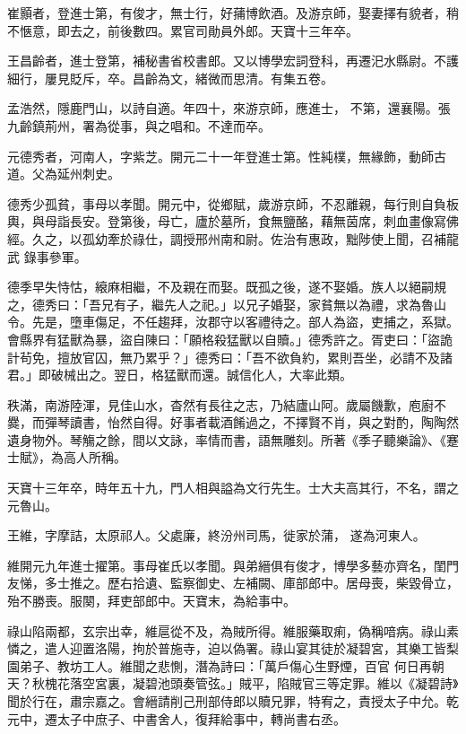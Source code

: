 \begin{pinyinscope}
 崔顥者，登進士第，有俊才，無士行，好蒱博飲酒。及游京師，娶妻擇有貌者，稍不愜意，即去之，前後數四。累官司勛員外郎。天寶十三年卒。



 王昌齡者，進士登第，補秘書省校書郎。又以博學宏詞登科，再遷汜水縣尉。不護細行，屢見貶斥，卒。昌齡為文，緒微而思清。有集五卷。



 孟浩然，隱鹿門山，以詩自適。年四十，來游京師，應進士，
 不第，還襄陽。張九齡鎮荊州，署為從事，與之唱和。不達而卒。



 元德秀者，河南人，字紫芝。開元二十一年登進士第。性純樸，無緣飾，動師古道。父為延州刺史。



 德秀少孤貧，事母以孝聞。開元中，從鄉賦，歲游京師，不忍離親，每行則自負板輿，與母詣長安。登第後，母亡，廬於墓所，食無鹽酪，藉無茵席，刺血畫像寫佛經。久之，以孤幼牽於祿仕，調授邢州南和尉。佐治有惠政，黜陟使上聞，召補龍武
 錄事參軍。



 德季早失恃怙，縗麻相繼，不及親在而娶。既孤之後，遂不娶婚。族人以絕嗣規之，德秀曰：「吾兄有子，繼先人之祀。」以兄子婚娶，家貧無以為禮，求為魯山令。先是，墮車傷足，不任趨拜，汝郡守以客禮待之。部人為盜，吏捕之，系獄。會縣界有猛獸為暴，盜自陳曰：「願格殺猛獸以自贖。」德秀許之。胥吏曰：「盜詭計茍免，擅放官囚，無乃累乎？」德秀曰：「吾不欲負約，累則吾坐，必請不及諸君。」即破械出之。翌日，格猛獸而還。誠信化人，大率此類。



 秩滿，南游陸渾，見佳山水，杳然有長往之志，乃結廬山阿。歲屬饑歉，庖廚不爨，而彈琴讀書，怡然自得。好事者載酒餚過之，不擇賢不肖，與之對酌，陶陶然遺身物外。琴觴之餘，間以文詠，率情而書，語無雕刻。所著《季子聽樂論》、《蹇士賦》，為高人所稱。



 天寶十三年卒，時年五十九，門人相與謚為文行先生。士大夫高其行，不名，謂之元魯山。



 王維，字摩詰，太原祁人。父處廉，終汾州司馬，徙家於蒲，
 遂為河東人。



 維開元九年進士擢第。事母崔氏以孝聞。與弟縉俱有俊才，博學多藝亦齊名，閨門友悌，多士推之。歷右拾遺、監察御史、左補闕、庫部郎中。居母喪，柴毀骨立，殆不勝喪。服闋，拜吏部郎中。天寶末，為給事中。



 祿山陷兩都，玄宗出幸，維扈從不及，為賊所得。維服藥取痢，偽稱喑病。祿山素憐之，遣人迎置洛陽，拘於普施寺，迫以偽署。祿山宴其徒於凝碧宮，其樂工皆梨園弟子、教坊工人。維聞之悲惻，潛為詩曰：「萬戶傷心生野煙，百官
 何日再朝天？秋槐花落空宮裏，凝碧池頭奏管弦。」賊平，陷賊官三等定罪。維以《凝碧詩》聞於行在，肅宗嘉之。會縉請削己刑部侍郎以贖兄罪，特宥之，責授太子中允。乾元中，遷太子中庶子、中書舍人，復拜給事中，轉尚書右丞。




\end{pinyinscope}
